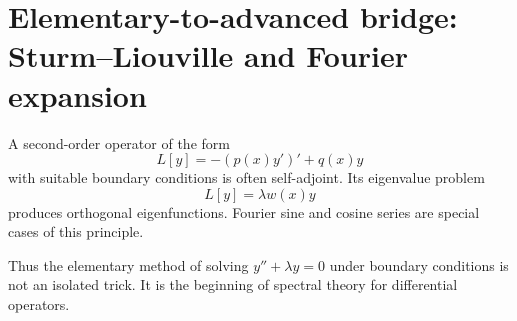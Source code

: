 \section{Elementary-to-advanced bridge: Sturm--Liouville and Fourier expansion}

A second-order operator of the form
\[
  L[y]=-(p(x)y')'+q(x)y
\]
with suitable boundary conditions is often self-adjoint.  Its eigenvalue problem
\[
  L[y]=\lambda w(x)y
\]
produces orthogonal eigenfunctions.  Fourier sine and cosine series are special cases of this principle.

Thus the elementary method of solving $y''+\lambda y=0$ under boundary conditions is not an isolated trick.  It is the beginning of spectral theory for differential operators.
